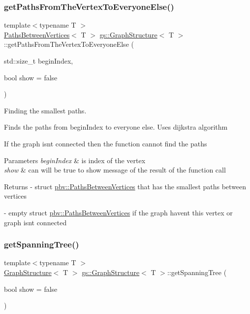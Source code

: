 \subsubsection{\texorpdfstring{get\+Paths\+From\+The\+Vertex\+To\+Everyone\+Else()}{getPathsFromTheVertexToEveryoneElse()}}
{\footnotesize\ttfamily template$<$typename T $>$ \\
\mbox{\hyperlink{structpbv_1_1_paths_between_vertices}{Paths\+Between\+Vertices}}$<$ T $>$ \mbox{\hyperlink{classgs_1_1_graph_structure}{gs\+::\+Graph\+Structure}}$<$ T $>$\+::get\+Paths\+From\+The\+Vertex\+To\+Everyone\+Else (\begin{DoxyParamCaption}\item[{std\+::size\+\_\+t}]{begin\+Index,  }\item[{bool}]{show = {\ttfamily false} }\end{DoxyParamCaption})}



Finding the smallest paths. 

Finds the paths from begin\+Index to everyone else. Uses dijkstra algorithm

If the graph isn\textquotesingle{}t connected then the function cannot find the paths


\begin{DoxyParams}{Parameters}
{\em begin\+Index} & is index of the vertex \\
\hline
{\em show} & can will be true to show message of the result of the function call \\
\hline
\end{DoxyParams}
\begin{DoxyReturn}{Returns}
-\/ \textquotesingle{}struct \mbox{\hyperlink{structpbv_1_1_paths_between_vertices}{pbv\+::\+Paths\+Between\+Vertices}}\textquotesingle{} that has the smallest paths between vertices 

-\/ empty \textquotesingle{}struct \mbox{\hyperlink{structpbv_1_1_paths_between_vertices}{pbv\+::\+Paths\+Between\+Vertices}}\textquotesingle{} if the graph haven\textquotesingle{}t this vertex or graph isn\textquotesingle{}t connected 
\end{DoxyReturn}
\mbox{\label{classgs_1_1_graph_structure_adb32325d5e18eaf7bec12e6fc64e93c9}} 
\subsubsection{\texorpdfstring{get\+Spanning\+Tree()}{getSpanningTree()}}
{\footnotesize\ttfamily template$<$typename T $>$ \\
\mbox{\hyperlink{classgs_1_1_graph_structure}{Graph\+Structure}}$<$ T $>$ \mbox{\hyperlink{classgs_1_1_graph_structure}{gs\+::\+Graph\+Structure}}$<$ T $>$\+::get\+Spanning\+Tree (\begin{DoxyParamCaption}\item[{bool}]{show = {\ttfamily false} }\end{DoxyParamCaption})}



